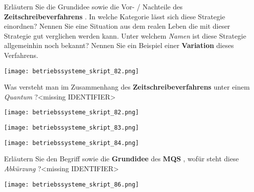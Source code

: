 \documentclass{article}
\begin{document}
\begin{tcolorbox}[colback=white!10!white,colframe=lightgray!75!black,
  savelowerto=\jobname_ex.tex,breakable,enhanced,lines before break=40]

\begin{center}
Erläutern Sie die Grundidee sowie die Vor- / Nachteile des 
\textbf{Zeitschreibeverfahrens
}. In welche Kategorie lässt sich diese Strategie einordnen?
Nennen Sie eine Situation aus dem realen Leben die mit dieser Strategie gut verglichen werden kann.
Unter welchem 
\textit{Namen
} ist diese Strategie allgemeinhin noch bekannt?
Nennen Sie ein Beispiel einer 
\textbf{Variation
} dieses Verfahrens.

\end{center}

\tcblower

\justifying
\begin{center}
\texttt{[image: betriebssysteme\_skript\_82.png]}
\end{center}

\end{tcolorbox}
\begin{tcolorbox}[colback=white!10!white,colframe=lightgray!75!black,
  savelowerto=\jobname_ex.tex,breakable,enhanced,lines before break=40]

\begin{center}
Was versteht man im Zusammenhang des 
\textbf{Zeitschreibeverfahrens
} unter einem 
\textit{Quantum
}?<missing IDENTIFIER>

\end{center}

\tcblower

\justifying
\begin{center}
\texttt{[image: betriebssysteme\_skript\_82.png]}
\end{center}
\begin{center}
\texttt{[image: betriebssysteme\_skript\_83.png]}
\end{center}
\begin{center}
\texttt{[image: betriebssysteme\_skript\_84.png]}
\end{center}

\end{tcolorbox}
\begin{tcolorbox}[colback=white!10!white,colframe=lightgray!75!black,
  savelowerto=\jobname_ex.tex,breakable,enhanced,lines before break=40]

\begin{center}
Erläutern Sie den Begriff sowie die 
\textbf{Grundidee
} des 
\textbf{MQS
}, wofür steht diese 
\textit{Abkürzung
}?<missing IDENTIFIER>

\end{center}

\tcblower

\justifying
\begin{center}
\texttt{[image: betriebssysteme\_skript\_86.png]}
\end{center}

\end{tcolorbox}
\end{document}
